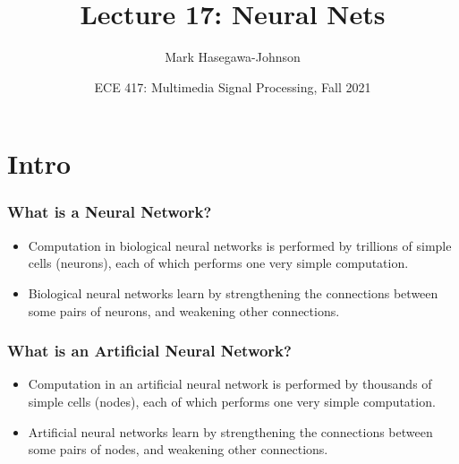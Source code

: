\documentclass{beamer}
\title{Lecture 17: Neural Nets}
\author{Mark Hasegawa-Johnson}
\date{ECE 417: Multimedia Signal Processing, Fall 2021}
\begin{document}
\begin{frame}
  \maketitle
\end{frame}

\begin{frame}
  \tableofcontents
\end{frame}


\section{Intro}
\setcounter{subsection}{1}
\begin{frame}
  \frametitle{What is a Neural Network?}
  \begin{itemize}
  \item Computation in biological neural networks is performed by
    trillions of simple cells (neurons), each of which performs one
    very simple computation.
  \item Biological neural networks learn by strengthening  the connections
    between some pairs of neurons, and weakening other connections.
  \end{itemize}
\end{frame}

\begin{frame}
  \frametitle{What is an Artificial Neural Network?}
  \begin{itemize}
  \item Computation in an artificial neural network is performed by
    thousands of simple cells (nodes), each of which performs one
    very simple computation.
  \item Artificial neural networks learn by strengthening  the connections
    between some pairs of nodes, and weakening other connections.
  \end{itemize}
\end{frame}
\end{document}
